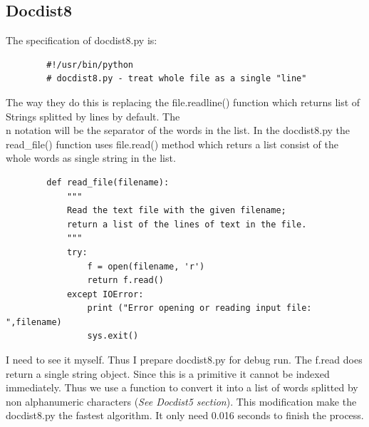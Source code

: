\documentclass{article}
\begin{document}
    \subsection{Docdist8}
    The specification of docdist8.py is:
    \begin{lstlisting}
        #!/usr/bin/python
        # docdist8.py - treat whole file as a single "line"
    \end{lstlisting}
    The way they do this is replacing the file.readline() function which returns list of Strings splitted by lines by default.
    The \\n notation will be the separator of the words in the list. 
    In the docdist8.py the read\_file() function uses file.read() method which returs a list consist of the whole words as single string in the list. 
    \begin{lstlisting}
        def read_file(filename):
            """ 
            Read the text file with the given filename;
            return a list of the lines of text in the file.
            """
            try:
                f = open(filename, 'r')
                return f.read()
            except IOError:
                print ("Error opening or reading input file: ",filename)
                sys.exit()
    \end{lstlisting}
    I need to see it myself. Thus I prepare docdist8.py for debug run. 
    The f.read does return a single string object. Since this is a primitive it cannot be indexed immediately.
    Thus we use a function to convert it into a list of words splitted by non alphanumeric characters (\textit{See Docdist5 section}).
    This modification make the docdist8.py the fastest algorithm. It only need 0.016 seconds to finish the process.
\end{document}
